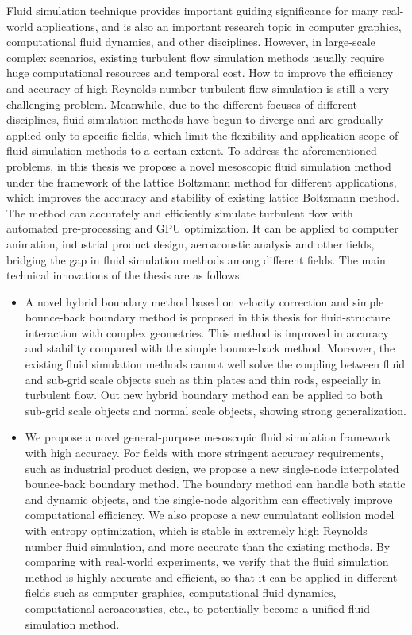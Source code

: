 \begin{abstract*}[flattitle]
  Fluid simulation technique provides important guiding significance for many real-world applications, and is also an important research topic in computer graphics, computational fluid dynamics, and other disciplines.
  However, in large-scale complex scenarios, existing turbulent flow simulation methods usually require huge computational resources and temporal cost.
  How to improve the efficiency and accuracy of high Reynolds number turbulent flow simulation is still a very challenging problem.
  Meanwhile, due to the different focuses of different disciplines, fluid simulation methods have begun to diverge and are gradually applied only to specific fields, which limit the flexibility and application scope of fluid simulation methods to a certain extent.
  To address the aforementioned problems, in this thesis we propose a novel mesoscopic fluid simulation method under the framework of the lattice Boltzmann method for different applications, which improves the accuracy and stability of existing lattice Boltzmann method. The method can accurately and efficiently simulate turbulent flow with automated pre-processing and GPU optimization. It can be applied to computer animation, industrial product design, aeroacoustic analysis and other fields, bridging the gap in fluid simulation methods among different fields. The main technical innovations of the thesis are as follows:
  \begin{itemize}
    \item A novel hybrid boundary method based on velocity correction and simple bounce-back boundary method is proposed in this thesis for fluid-structure interaction with complex geometries. This method is improved in accuracy and stability compared with the simple bounce-back method. Moreover, the existing fluid simulation methods cannot well solve the coupling between fluid and sub-grid scale objects such as thin plates and thin rods, especially in turbulent flow. Out new hybrid boundary method can be applied to both sub-grid scale objects and normal scale objects, showing strong generalization.
    \item We propose a novel general-purpose mesoscopic fluid simulation framework with high accuracy. For fields with more stringent accuracy requirements, such as industrial product design, we propose a new single-node interpolated bounce-back boundary method. The boundary method can handle both static and dynamic objects, and the single-node algorithm can effectively improve computational efficiency. We also propose a new cumulatant collision model with entropy optimization, which is stable in extremely high Reynolds number fluid simulation, and more accurate than the existing methods. By comparing with real-world experiments, we verify that the fluid simulation method is highly accurate and efficient, so that it can be applied in different fields such as computer graphics, computational fluid dynamics, computational aeroacoustics, etc., to potentially become a unified fluid simulation method.

\end{itemize}
\end{abstract*}
